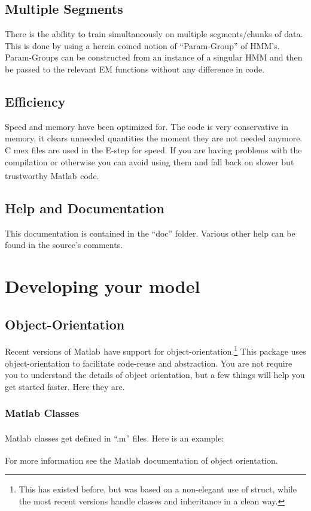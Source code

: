 \documentclass[]{scrreprt}
\newcommand{\Matlab}{Matlab\textsuperscript{\textregistered~}}
\begin{document}
\section{Multiple Segments} There is the
ability to train simultaneously on multiple segments/chunks of data.
This is done by using a herein coined notion
of ``Param-Group'' of HMM's. Param-Groups can be constructed from an instance of
a singular HMM and then be passed to the relevant EM functions without any
difference in code.

\section{Efficiency}
Speed and memory have been optimized for. The code is very conservative in
memory, it clears unneeded quantities the moment they are not needed anymore.
C mex files are used in the E-step for speed. If you are having
problems with the compilation or otherwise you can avoid using them
and fall back on slower but trustworthy \Matlab code.

\section{Help and Documentation}
This documentation is contained in the ``doc'' folder.
Various other help can be found in the source's comments.

\chapter{Developing your model}

\section{Object-Orientation}
Recent versions of \Matlab have support for object-orientation.\footnote{This
has existed before, but was based on a non-elegant use of struct, while the
most recent versions handle classes and inheritance in a clean way.}
This package uses object-orientation to facilitate code-reuse and
abstraction. You are not require you to understand the details of object
orientation, but a few things will help you get started faster. Here they are.
\subsection{Matlab Classes}
\Matlab classes get defined in ``.m'' files. Here is an example:

For more information see the \Matlab documentation of object orientation.
\end{document}
